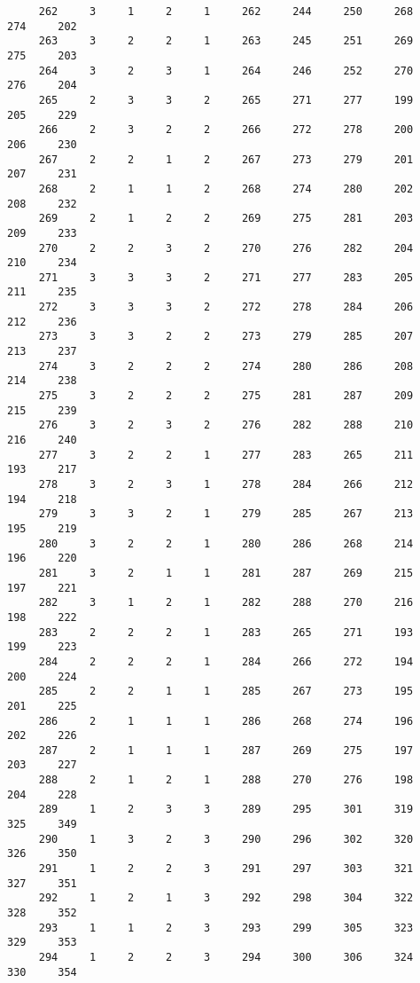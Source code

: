 \begin{verbatim}
     262     3     1     2     1     262     244     250     268     274     202
     263     3     2     2     1     263     245     251     269     275     203
     264     3     2     3     1     264     246     252     270     276     204
     265     2     3     3     2     265     271     277     199     205     229
     266     2     3     2     2     266     272     278     200     206     230
     267     2     2     1     2     267     273     279     201     207     231
     268     2     1     1     2     268     274     280     202     208     232
     269     2     1     2     2     269     275     281     203     209     233
     270     2     2     3     2     270     276     282     204     210     234
     271     3     3     3     2     271     277     283     205     211     235
     272     3     3     3     2     272     278     284     206     212     236
     273     3     3     2     2     273     279     285     207     213     237
     274     3     2     2     2     274     280     286     208     214     238
     275     3     2     2     2     275     281     287     209     215     239
     276     3     2     3     2     276     282     288     210     216     240
     277     3     2     2     1     277     283     265     211     193     217
     278     3     2     3     1     278     284     266     212     194     218
     279     3     3     2     1     279     285     267     213     195     219
     280     3     2     2     1     280     286     268     214     196     220
     281     3     2     1     1     281     287     269     215     197     221
     282     3     1     2     1     282     288     270     216     198     222
     283     2     2     2     1     283     265     271     193     199     223
     284     2     2     2     1     284     266     272     194     200     224
     285     2     2     1     1     285     267     273     195     201     225
     286     2     1     1     1     286     268     274     196     202     226
     287     2     1     1     1     287     269     275     197     203     227
     288     2     1     2     1     288     270     276     198     204     228
     289     1     2     3     3     289     295     301     319     325     349
     290     1     3     2     3     290     296     302     320     326     350
     291     1     2     2     3     291     297     303     321     327     351
     292     1     2     1     3     292     298     304     322     328     352
     293     1     1     2     3     293     299     305     323     329     353
     294     1     2     2     3     294     300     306     324     330     354

\end{verbatim}
